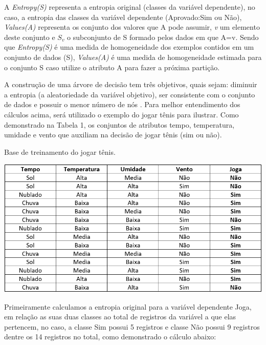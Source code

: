 \par
A \textit{Entropy(S)} representa a entropia original (classes da variável dependente), no caso, a entropia das classes da variável dependente (Aprovado:Sim ou Não), \textit{Values(A)} representa os conjunto dos valores que A pode assumir, \textit{v} um elemento deste conjunto e $S_v$ o subconjunto de S formado pelos dados em que A=v. Sendo que \textit{Entropy(S)} é uma medida de homogeneidade  dos exemplos contidos em um conjunto de dados (S), \textit{Values(A)} é uma medida de homogeneidade estimada para o
conjunto S caso utilize o atributo A para fazer a próxima partição.

\par
A construção de uma árvore de decisão tem três objetivos, quais sejam: diminuir a entropia (a aleatoriedade da variável objetivo), ser consistente com o conjunto de dados e possuir o menor número de nós \cite{Steiner2004}. Para melhor entendimento dos cálculos acima, será utilizado o exemplo do jogar tênis para ilustrar. Como demonstrado na Tabela 1, os conjuntos de atributos tempo, temperatura, umidade e vento que auxiliam na decisão de jogar tênis (sim ou não).

\par
\begin{table}[!htp]
	\begin{center}
    \caption{\label{fig:waveform_fig} Base de treinamento do jogar tênis.}
	\includegraphics[scale=0.65]{Figuras/Jogar_tenis.png}
	\end{center}
\end{table}

\par
Primeiramente calculamos a entropia original para a variável dependente Joga, em relação as suas duas classes ao total de registros da variável a que elas pertencem, no caso, a classe Sim possui 5 registros e classe Não possui 9 registros dentre os 14 registros no total, como demonstrado o cálculo abaixo:

